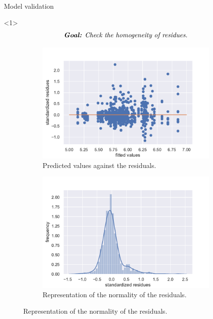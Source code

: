 \documentclass[unknownkeysallowed]{beamer}
\begin{document}
\begin{frame}{Model validation}
\begin{onlyenv}<1>
\vspace{-0.7cm}
\[\textit{\textbf{Goal:} Check the homogeneity of residues.}\]
\begin{figure}[H]
\centering
\begin{subfigure}{.5\textwidth}
  \centering
  \includegraphics[width=1\linewidth]{./images/homo_mod2.pdf}
  \caption{Predicted values against the residuals.}
\end{subfigure}%
\begin{subfigure}{.5\textwidth}
  \centering
  \includegraphics[width=1\linewidth, clip,trim={0cm 0cm 0cm 0cm} ]{./images/resid_norm_m2.pdf}
  \caption{Representation of the normality of the residuals.}
\end{subfigure}

\end{figure}
\end{onlyenv}
\end{frame}
\end{document}
